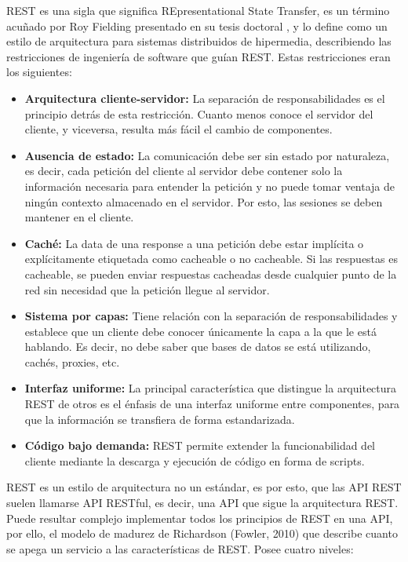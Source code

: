 REST es una sigla que significa REpresentational State Transfer, es un término acuñado por Roy Fielding presentado en su tesis doctoral \cite{fieldingapi}, y lo define como un estilo de arquitectura para sistemas distribuidos de hipermedia, describiendo las restricciones de ingeniería de software que guían REST. Estas restricciones eran los siguientes:
\begin{itemize}
    \item \textbf{Arquitectura cliente-servidor:} La separación de responsabilidades es el principio detrás de esta restricción. Cuanto menos conoce el servidor del cliente, y viceversa, resulta más fácil el cambio de componentes.
    \item \textbf{Ausencia de estado:} La comunicación debe ser sin estado por naturaleza, es decir, cada petición del cliente al servidor debe contener solo la información necesaria para entender la petición y no puede tomar ventaja de ningún contexto almacenado en el servidor. Por esto, las sesiones se deben mantener en el cliente.
    \item \textbf{Caché:} La data de una response a una petición debe estar implícita o explícitamente etiquetada como cacheable o no cacheable. Si las respuestas es cacheable, se pueden enviar respuestas cacheadas desde cualquier punto de la red sin necesidad que la petición llegue al servidor.
    \item \textbf{Sistema por capas:} Tiene relación con la separación de responsabilidades y establece que un cliente debe conocer únicamente la capa a la que le está hablando.  Es decir, no debe saber que bases de datos se está utilizando, cachés, proxies, etc.
    \item \textbf{Interfaz uniforme:} La principal característica que distingue la arquitectura REST de otros es el énfasis de una interfaz uniforme entre componentes, para que la información se transfiera de forma estandarizada. 
    \item \textbf{Código bajo demanda:} REST permite extender la funcionabilidad del cliente mediante la descarga y ejecución de código en forma de scripts. 
\end{itemize}
REST es un estilo de arquitectura no un estándar, es por esto, que las API REST suelen llamarse API RESTful, es decir, una API que sigue la arquitectura REST. Puede resultar complejo implementar todos los principios de REST en una API, por ello, el modelo de madurez de Richardson (Fowler, 2010) que describe cuanto se apega un servicio a las características de REST. Posee cuatro niveles:
